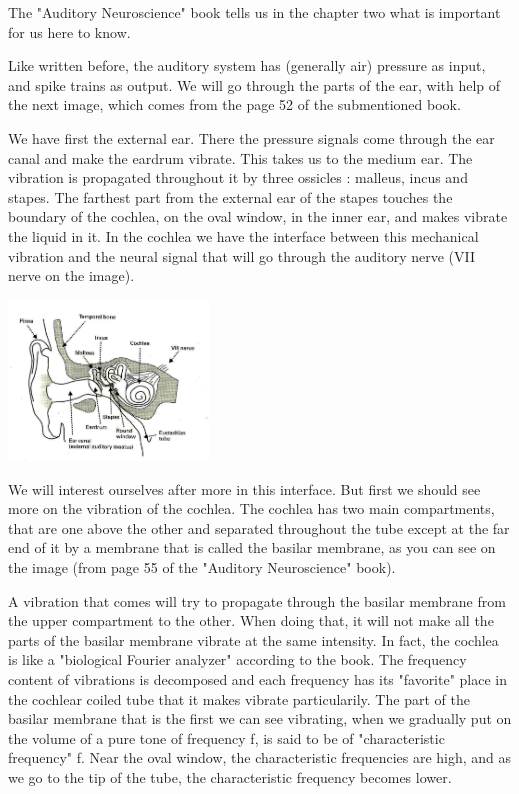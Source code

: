 The "Auditory Neuroscience" book\cite{AuditoryNeuroscience} tells us in the 
chapter two what is important for us here to know. 

Like written before, the auditory system has (generally air) pressure as input, 
and spike trains as output. We will go through the parts of the ear, with help 
of the next image, which comes from the page 52 of the submentioned book. 

We have first the external ear. There the pressure signals come through the ear 
canal and make the eardrum vibrate. This takes us to the medium ear. 
The vibration is propagated throughout it by three ossicles : malleus, incus 
and stapes. The farthest part from the external ear of the stapes touches the 
boundary of the cochlea, on the oval window, in the inner ear, and makes vibrate
 the liquid in it. 
In the cochlea we have the interface between this mechanical vibration 
and the neural signal that will go through the auditory nerve 
(VII nerve on the image).

\includegraphics[width=0.4\textwidth]{images/ear-aud52-level.jpg}

We will interest ourselves after more in this interface. But first we should see 
more on the vibration of the cochlea. The cochlea has two main compartments, 
that are one above the other and separated 
throughout the tube except at the far end of it by a membrane that is called 
the basilar membrane, as you can see on the image 
(from page 55 of the "Auditory Neuroscience" book).


A vibration that comes will try to propagate through the basilar membrane from 
the upper compartment to the other. When doing that, it will not make all 
the parts of the basilar membrane vibrate at the same intensity. 
In fact, the cochlea is like a "biological Fourier analyzer" according to the book. 
The frequency content of vibrations is decomposed and each frequency has its 
"favorite" place in the cochlear coiled tube that it makes vibrate particularily. 
The part of the basilar membrane that is the first we can see vibrating, 
when we gradually put on the volume of a pure tone of frequency f, is said to be of 
"characteristic frequency" f. Near the oval window, the characteristic 
frequencies are high, and as we go to the tip of the tube, 
the characteristic frequency becomes lower.

